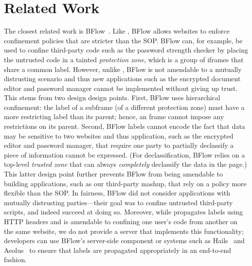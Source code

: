 \section{Related Work}
\label{sec:related}

The closest related work is BFlow~\cite{Yip:2009:PBS}.
%
Like \sys{}, BFlow allows websites to enforce confinement policies
that are stricter than the SOP.
%
BFlow can, for example, be used to confine third-party code such as
the password strength checker by placing the untrusted code in a
tainted \emph{protection zone}, which is a group of iframes that share
a common label.
%
However, unlike \sys{}, BFlow is not amendable to a mutually
distrusting scenario and thus new applications such as the encrypted
document editor and password manager cannot be implemented without
giving up trust.
%
This stems from two design design points.
%
First, BFlow uses hierarchical confinement: the label of a subframe
(of a different protection zone) must have a more restricting label
than its parent; hence, an frame cannot impose any restrictions on its
parent.
%
Second, BFlow labels cannot encode the fact that data may be sensitive
to two websites and thus application, such as the encrypted editor and
password manager, that require one party to partially declassify a
piece of information cannot be expressed.
%
(For declassification, BFlow relies on a top-level \emph{trusted zone}
that can always \emph{completely} declassify the data in the page.)
%
This latter design point further prevents BFlow from being amendable
to building applications, such as our third-party mashup, that rely on
a policy more flexible than the SOP.
%
In fairness, BFlow did not consider applications with mutually
distrusting parties---their goal was to confine untrusted third-party
scripts, and indeed succeed at doing so.
%
Moreover, while \sys{} propagates labels using HTTP headers and is
amendable to confining one user's code from another on the same
website, we do not provide a server that implements this
functionality; developers can use BFlow's server-side component or
systems such as Hails~\cite{giffin:2012:hails} and
Aeolus~\cite{cheng:aeolus} to ensure that labels are propagated
appropriately in an end-to-end fashion.
%




